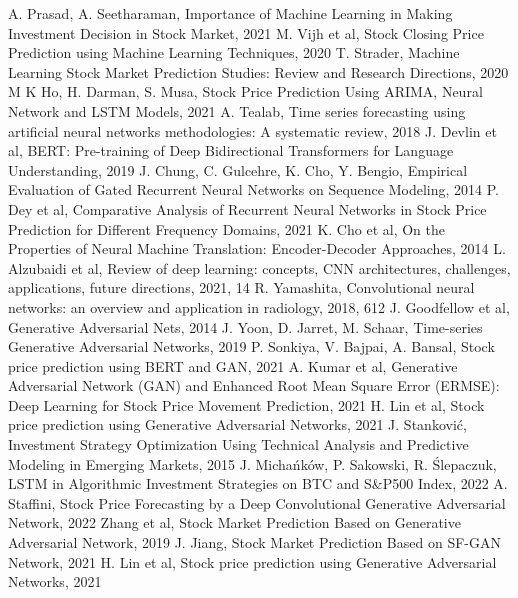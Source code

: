 \documentclass[11pt]{article} %
\begin{document}
\begin{thebibliography}{9}
A. Prasad, A. Seetharaman, Importance of Machine Learning in Making Investment Decision in Stock Market, 2021
M. Vijh et al, Stock Closing Price Prediction using Machine Learning Techniques, 2020
T. Strader, Machine Learning Stock Market Prediction Studies: Review and Research Directions, 2020
M K Ho, H. Darman, S. Musa,  Stock Price Prediction Using ARIMA, Neural Network and LSTM Models, 2021
A. Tealab, Time series forecasting using artificial neural networks methodologies: A systematic review, 2018
J. Devlin et al, BERT: Pre-training of Deep Bidirectional Transformers for Language Understanding, 2019
J. Chung, C. Gulcehre, K. Cho, Y. Bengio, Empirical Evaluation of Gated Recurrent Neural Networks on Sequence Modeling, 2014
P. Dey et al, Comparative Analysis of Recurrent Neural Networks in Stock Price Prediction for Different Frequency Domains, 2021 
K. Cho et al, On the Properties of Neural Machine Translation: Encoder-Decoder Approaches, 2014
L. Alzubaidi et al, Review of deep learning: concepts, CNN architectures, challenges, applications, future directions, 2021, 14
R. Yamashita, Convolutional neural networks: an overview and application in radiology, 2018, 612
J. Goodfellow et al, Generative Adversarial Nets, 2014
J. Yoon, D. Jarret, M. Schaar, Time-series Generative Adversarial Networks, 2019
P. Sonkiya, V. Bajpai, A. Bansal, Stock price prediction using BERT and GAN, 2021
A. Kumar et al, Generative Adversarial Network (GAN) and Enhanced Root Mean Square Error (ERMSE): Deep Learning for Stock Price Movement Prediction, 2021
H. Lin et al, Stock price prediction using Generative Adversarial Networks, 2021 
J. Stanković, Investment Strategy Optimization Using Technical Analysis and Predictive Modeling in Emerging Markets, 2015
J. Michańków, P. Sakowski, R. Ślepaczuk, LSTM in Algorithmic Investment Strategies on BTC and S\&P500 Index, 2022
A. Staffini, Stock Price Forecasting by a Deep Convolutional Generative Adversarial Network, 2022
Zhang et al, Stock Market Prediction Based on Generative Adversarial Network, 2019
J. Jiang, Stock Market Prediction Based on SF-GAN Network, 2021
H. Lin et al, Stock price prediction using Generative Adversarial Networks, 2021

\end{thebibliography}
\end{document}
